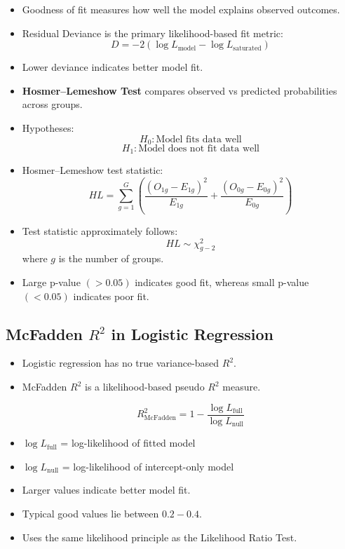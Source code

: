 \documentclass[10pt,a4paper]{article}
\begin{document}
	\begin{itemize}
	    \item Goodness of fit measures how well the model explains observed outcomes.
	    
	    \item Residual Deviance is the primary likelihood-based fit metric:
	    $$
	    D = -2(\log L_{\text{model}} - \log L_{\text{saturated}})
	    $$
	    
	    \item Lower deviance indicates better model fit.
	    
	    \item \textbf{Hosmer--Lemeshow Test} compares observed vs predicted probabilities across groups.
	    
	    \item Hypotheses:
	    $$
	    H_0 : \text{Model fits data well}
	    $$
	    $$
	    H_1 : \text{Model does not fit data well}
	    $$
	    
	    \item Hosmer--Lemeshow test statistic:
	    $$
	    HL =
	    \sum_{g=1}^{G}
	    \left(
	    \frac{(O_{1g}-E_{1g})^2}{E_{1g}}
	    +
	    \frac{(O_{0g}-E_{0g})^2}{E_{0g}}
	    \right)
	    $$
	    
	    \item Test statistic approximately follows:
	    $$
	    HL \sim \chi^2_{g-2}
	    $$
	    where $g$ is the number of groups.
	    
	    \item Large p-value $(>0.05)$ indicates good fit, whereas small p-value $(<0.05)$ indicates poor fit.
	\end{itemize}
	
	
	\subsection{McFadden $R^2$ in Logistic Regression}
	
	\begin{itemize}
	    \item Logistic regression has no true variance-based $R^2$.
	    
	    \item McFadden $R^2$ is a likelihood-based pseudo $R^2$ measure.
	    
	    $$
	    R^2_{\text{McFadden}}
	    =
	    1 -
	    \frac{
	    \log L_{\text{full}}
	    }{
	    \log L_{\text{null}}
	    }
	    $$
	    
	    \item $\log L_{\text{full}}$ = log-likelihood of fitted model
	    
	    \item $\log L_{\text{null}}$ = log-likelihood of intercept-only model
	    
	    \item Larger values indicate better model fit.
	    
	    \item Typical good values lie between $0.2 - 0.4$.
	    
	    \item Uses the same likelihood principle as the Likelihood Ratio Test.
	\end{itemize}
	
\end{document}
